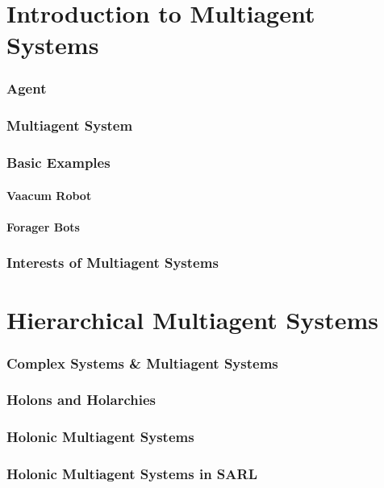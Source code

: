 \part[author={Prof.Dr. Nicolas GAUD}]{Introduction to Multiagent Systems}
\begin{bibliographysection}

	\section{Agent}
	

	\section{Multiagent System}
	

	\section{Basic Examples}
	\subsection{Vaacum Robot}
	
	\subsection{Forager Bots}
	

	\section{Interests of Multiagent Systems}
	

	\thanksslide
\end{bibliographysection}

\part[author={Prof.Dr. Nicolas GAUD}]{Hierarchical Multiagent Systems}
\begin{bibliographysection}

	\section{Complex Systems \& Multiagent Systems}
	
	\section{Holons and Holarchies}
	
	\section{Holonic Multiagent Systems}
	
	\section{Holonic Multiagent Systems in SARL}
	

\end{bibliographysection}


